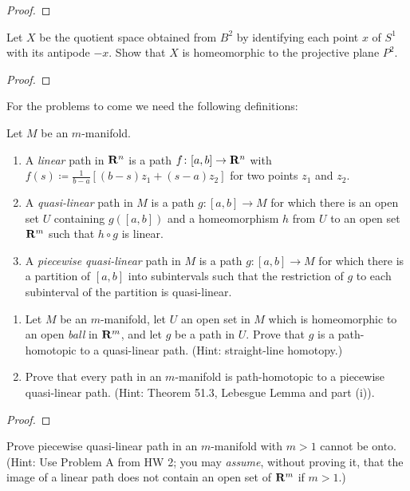 \begin{proof}
\end{proof}
\newpage
\begin{problem}[Munkres \S60, Ex.\,2]
Let $X$ be the quotient space obtained from $B^2$ by identifying each point
$x$ of $S^1$ with its antipode $-x$. Show that $X$ is homeomorphic to the
projective plane $P^2$.
\end{problem}
\begin{proof}
\end{proof}
\newpage
\thispagestyle{empty}
For the problems to come we need the following definitions:
\begin{definition*}
Let $M$ be an  $m$-manifold.
\begin{enumerate}[label=(\roman*)]
\item A \emph{linear} path in $\mathbf{R}^n$ is a path $f\colon[a,b]\to\mathbf{R}^n$ with
  $f(s)\coloneqq\tfrac{1}{b-a}[(b-s)z_1+(s-a)z_2]$ for two points $z_1$ and $z_2$.
\item A \emph{quasi-linear} path in $M$ is a path $g\colon[a,b]\to M$ for
  which there is an open set $U$ containing $g([a,b])$ and a homeomorphism
  $h$ from $U$ to an open set $\mathbf{R}^m$ such that $h\circ g$ is linear.
\item A \emph{piecewise quasi-linear} path in $M$ is a path
  $g\colon[a,b]\to M$ for which there is a partition of $[a,b]$ into
  subintervals such that the restriction of $g$ to each subinterval of the
  partition is  quasi-linear.
\end{enumerate}
\end{definition*}
\newpage
\begin{problem}[A]
\begin{enumerate}[label=(\roman*)]
\item Let $M$ be an $m$-manifold, let $U$ an open set in $M$ which is
  homeomorphic to an open \emph{ball} in $\mathbf{R}^m$, and let $g$ be a path in
  $U$. Prove that $g$ is a path-homotopic to a quasi-linear path. (Hint:
  straight-line homotopy.)
\item Prove that every path in an $m$-manifold is path-homotopic to a
  piecewise quasi-linear path. (Hint: Theorem 51.3, Lebesgue Lemma and part
  (i)).
\end{enumerate}
\end{problem}
\begin{proof}
\end{proof}
\newpage
\begin{problem}[B]
Prove piecewise quasi-linear path in an $m$-manifold with $m>1$ cannot be
onto. (Hint: Use Problem A from HW 2; you may \emph{assume}, without
proving it, that the image of a linear path does not contain an open set of
$\mathbf{R}^m$ if $m>1$.)
\end{problem}
